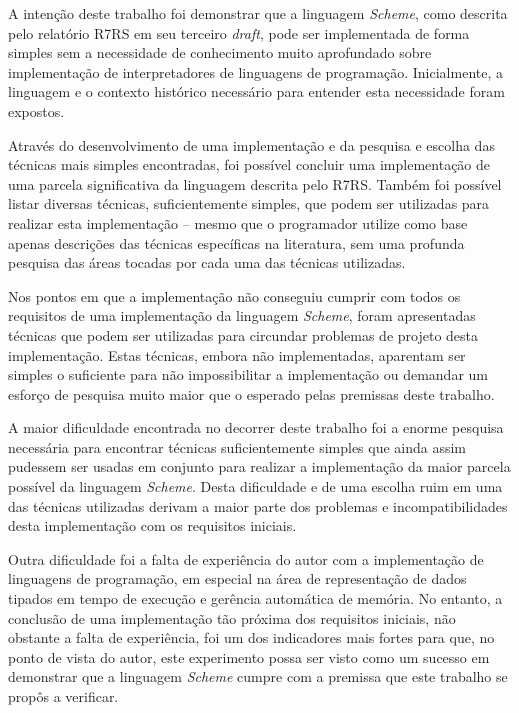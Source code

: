 A intenção deste trabalho foi demonstrar que a linguagem \textit{Scheme}, como
descrita pelo relatório \acs{R7RS} em seu terceiro \textit{draft}, pode ser
implementada de forma simples sem a necessidade de conhecimento muito
aprofundado sobre implementação de interpretadores de linguagens de
programação. Inicialmente, a linguagem e o contexto histórico necessário para
entender esta necessidade foram expostos.

Através do desenvolvimento de uma implementação e da pesquisa e escolha das
técnicas mais simples encontradas, foi possível concluir uma implementação de
uma parcela significativa da linguagem descrita pelo \acs{R7RS}. Também foi
possível  listar diversas técnicas, suficientemente simples, que podem ser
utilizadas para realizar esta implementação -- mesmo que o programador utilize
como base apenas descrições das técnicas específicas na literatura, sem uma
profunda pesquisa das áreas tocadas por cada uma das técnicas utilizadas.

Nos pontos em que a implementação não conseguiu cumprir com todos os requisitos
de uma implementação da linguagem \textit{Scheme}, foram apresentadas técnicas
que podem ser utilizadas para circundar problemas de projeto desta implementação.
Estas técnicas, embora não implementadas, aparentam ser simples o suficiente para
não impossibilitar a implementação ou demandar um esforço de pesquisa muito maior
que o esperado pelas premissas deste trabalho.

A maior dificuldade encontrada no decorrer deste trabalho foi a enorme pesquisa
necessária para encontrar técnicas suficientemente simples que ainda assim 
pudessem ser usadas em conjunto para realizar a implementação da maior parcela
possível da linguagem \textit{Scheme}. Desta dificuldade e de uma escolha ruim
em uma das técnicas utilizadas derivam a maior parte dos problemas e 
incompatibilidades desta implementação com os requisitos iniciais.

Outra dificuldade foi a falta de experiência do autor com a implementação de
linguagens de programação, em especial na área de representação de dados tipados
em tempo de execução e gerência automática de memória. No entanto, a conclusão
de uma implementação tão próxima dos requisitos iniciais, não obstante a falta
de experiência, foi um dos indicadores mais fortes para que, no ponto de vista do
autor, este experimento possa ser visto como um sucesso em demonstrar que a
linguagem \textit{Scheme} cumpre com a premissa que este trabalho se propôs a
verificar.

